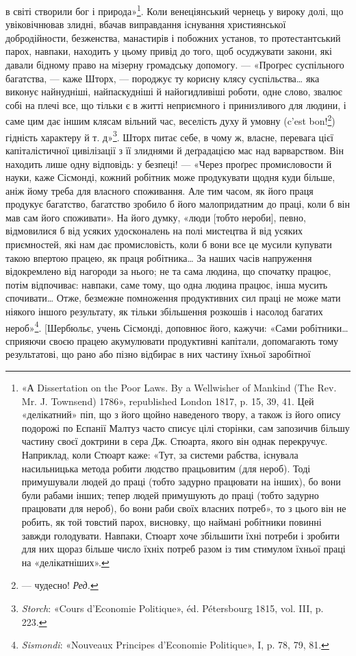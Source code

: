 \parcont{}  %
в світі створили бог і природа»\footnote{
«А Dissertation on the Poor Laws. By a Wellwisher of Mankind
(The Rev. Mr. J. Townsend) 1786», republished London 1817, p. 15, 39,
41. Цей «делікатний» піп, що з його щойно наведеного твору, а також із
його опису подорожі по Еспанії Малтуз часто списує цілі сторінки, сам
запозичив більшу частину своєї доктрини в сера Дж. Стюарта, якого він
однак перекручує. Наприклад, коли Стюарт каже: «Тут, за системи рабства,
існувала насильницька метода робити людство працьовитим (для
нероб). Тоді примушували людей до праці (тобто задурно працювати на
інших), бо вони були рабами інших; тепер людей примушують до праці
(тобто задурно працювати для нероб), бо вони раби своїх власних потреб»,
то з цього він не робить, як той товстий парох, висновку, що наймані
робітники повинні завжди голодувати. Навпаки, Стюарт хоче збільшити
їхні потреби і зробити для них щораз більше число їхніх потреб разом
із тим стимулом їхньої праці на «делікатніших».
}. Коли венеціянський чернець
у вироку долі, що увіковічнював злидні, вбачав виправдання
існування християнської добродійности, безженства, манастирів
і побожних установ, то протестантський парох, навпаки, находить
у цьому привід до того, щоб осуджувати закони, які давали бідному
право на мізерну громадську допомогу. — «Проґрес суспільного
багатства, — каже Шторх, — породжує ту корисну клясу суспільства\dots{}
яка виконує найнудніші, найпаскудніші й найогидливіші
роботи, одне слово, звалює собі на плечі все, що тільки є в житті
неприємного і принизливого для людини, і саме цим дає іншим
клясам вільний час, веселість духу й умовну (c’est bon!\footnote*{
— чудесно! \emph{Ред.}
}) гідність
характеру й т. д»\footnote{
\emph{Storch}: «Cours d’Economie Politique», éd. Pétersbourg 1815, vol. III,
p. 223.
}. Шторх питає себе, в чому ж, власне,
перевага цієї капіталістичної цивілізації з її злиднями й деґрадацією
мас над варварством. Він находить лише одну відповідь:
у безпеці! — «Через проґрес промисловости й науки, каже Сісмонді,
кожний робітник може продукувати щодня куди більше,
аніж йому треба для власного споживання. Але тим часом, як
його праця продукує багатство, багатство зробило б його малопридатним
до праці, коли б він мав сам його споживати». На його
думку, «люди [тобто нероби], певно, відмовилися б від усяких
удосконалень на полі мистецтва й від усяких приємностей, які
нам дає промисловість, коли б вони все це мусили купувати
такою впертою працею, як праця робітника\dots{} За наших часів
напруження відокремлено від нагороди за нього; не та сама людина,
що спочатку працює, потім відпочиває: навпаки, саме
тому, що одна людина працює, інша мусить спочивати\dots{} Отже,
безмежне помноження продуктивних сил праці не може мати
ніякого іншого результату, як тільки збільшення розкошів і
насолод багатих нероб»\footnote{
\emph{Sismondi}: «Nouveaux Principes d’Economie Politique», I, p. 78,
79, 81.
}. [Шербюльє, учень Сісмонді, доповнює
його, кажучи: «Сами робітники\dots{} сприяючи своєю працею акумулювати
продуктивні капітали, допомагають тому результатові,
що рано або пізно відбирає в них частину їхньої заробітної
\parbreak{}  %
